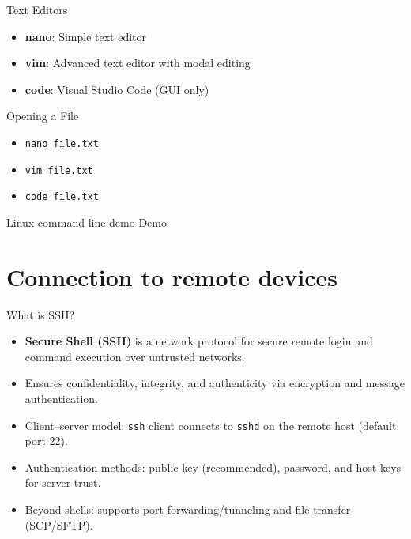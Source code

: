\documentclass{beamer}
\begin{document}
\begin{frame}{Text Editors}
  \begin{itemize}
    \item \textbf{nano}: Simple text editor
    \item \textbf{vim}: Advanced text editor with modal editing
    \item \textbf{code}: Visual Studio Code (GUI only)
  \end{itemize}
  \begin{exampleblock}{Opening a File}
    \begin{itemize}
      \item \texttt{nano file.txt}
      \item \texttt{vim file.txt}
      \item \texttt{code file.txt}
    \end{itemize}
  \end{exampleblock}
\end{frame}

\begin{frame}{Linux command line demo}
  Demo
\end{frame}

\section{Connection to remote devices}

\begin{frame}{What is SSH?}
  \begin{itemize}
    \item \textbf{Secure Shell (SSH)} is a network protocol for secure remote login and command execution over untrusted networks.
    \item Ensures confidentiality, integrity, and authenticity via encryption and message authentication.
    \item Client–server model: \texttt{ssh} client connects to \texttt{sshd} on the remote host (default port 22).
    \item Authentication methods: public key (recommended), password, and host keys for server trust.
    \item Beyond shells: supports port forwarding/tunneling and file transfer (SCP/SFTP).
  \end{itemize}
\end{frame}
\end{document}
